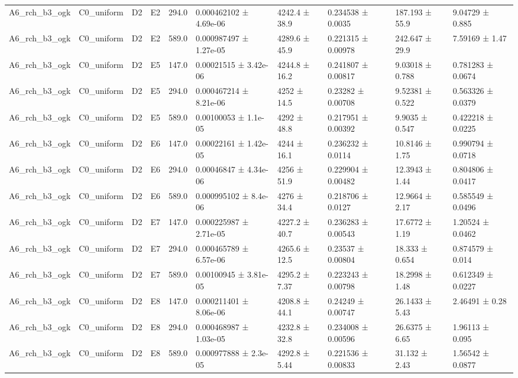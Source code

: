 \begin{table}
\begin{tabular}{llllllllll}
A6\_rch\_b3\_ogk & C0\_uniform & D2 & E2 & 294.0 & 0.000462102 ± 4.69e-06 & 4242.4 ± 38.9 & 0.234538 ± 0.0035 & 187.193 ± 55.9 & 9.04729 ± 0.885 \\
A6\_rch\_b3\_ogk & C0\_uniform & D2 & E2 & 589.0 & 0.000987497 ± 1.27e-05 & 4289.6 ± 45.9 & 0.221315 ± 0.00978 & 242.647 ± 29.9 & 7.59169 ± 1.47 \\
A6\_rch\_b3\_ogk & C0\_uniform & D2 & E5 & 147.0 & 0.00021515 ± 3.42e-06 & 4244.8 ± 16.2 & 0.241807 ± 0.00817 & 9.03018 ± 0.788 & 0.781283 ± 0.0674 \\
A6\_rch\_b3\_ogk & C0\_uniform & D2 & E5 & 294.0 & 0.000467214 ± 8.21e-06 & 4252 ± 14.5 & 0.23282 ± 0.00708 & 9.52381 ± 0.522 & 0.563326 ± 0.0379 \\
A6\_rch\_b3\_ogk & C0\_uniform & D2 & E5 & 589.0 & 0.00100053 ± 1.1e-05 & 4292 ± 48.8 & 0.217951 ± 0.00392 & 9.9035 ± 0.547 & 0.422218 ± 0.0225 \\
A6\_rch\_b3\_ogk & C0\_uniform & D2 & E6 & 147.0 & 0.00022161 ± 1.42e-05 & 4244 ± 16.1 & 0.236232 ± 0.0114 & 10.8146 ± 1.75 & 0.990794 ± 0.0718 \\
A6\_rch\_b3\_ogk & C0\_uniform & D2 & E6 & 294.0 & 0.00046847 ± 4.34e-06 & 4256 ± 51.9 & 0.229904 ± 0.00482 & 12.3943 ± 1.44 & 0.804806 ± 0.0417 \\
A6\_rch\_b3\_ogk & C0\_uniform & D2 & E6 & 589.0 & 0.000995102 ± 8.4e-06 & 4276 ± 34.4 & 0.218706 ± 0.0127 & 12.9664 ± 2.17 & 0.585549 ± 0.0496 \\
A6\_rch\_b3\_ogk & C0\_uniform & D2 & E7 & 147.0 & 0.000225987 ± 2.71e-05 & 4227.2 ± 40.7 & 0.236283 ± 0.00543 & 17.6772 ± 1.19 & 1.20524 ± 0.0462 \\
A6\_rch\_b3\_ogk & C0\_uniform & D2 & E7 & 294.0 & 0.000465789 ± 6.57e-06 & 4265.6 ± 12.5 & 0.23537 ± 0.00804 & 18.333 ± 0.654 & 0.874579 ± 0.014 \\
A6\_rch\_b3\_ogk & C0\_uniform & D2 & E7 & 589.0 & 0.00100945 ± 3.81e-05 & 4295.2 ± 7.37 & 0.223243 ± 0.00798 & 18.2998 ± 1.48 & 0.612349 ± 0.0227 \\
A6\_rch\_b3\_ogk & C0\_uniform & D2 & E8 & 147.0 & 0.000211401 ± 8.06e-06 & 4208.8 ± 44.1 & 0.24249 ± 0.00747 & 26.1433 ± 5.43 & 2.46491 ± 0.28 \\
A6\_rch\_b3\_ogk & C0\_uniform & D2 & E8 & 294.0 & 0.000468987 ± 1.03e-05 & 4232.8 ± 32.8 & 0.234008 ± 0.00596 & 26.6375 ± 6.65 & 1.96113 ± 0.095 \\
A6\_rch\_b3\_ogk & C0\_uniform & D2 & E8 & 589.0 & 0.000977888 ± 2.3e-05 & 4292.8 ± 5.44 & 0.221536 ± 0.00833 & 31.132 ± 2.43 & 1.56542 ± 0.0877 \\

\end{tabular}
\end{table}
